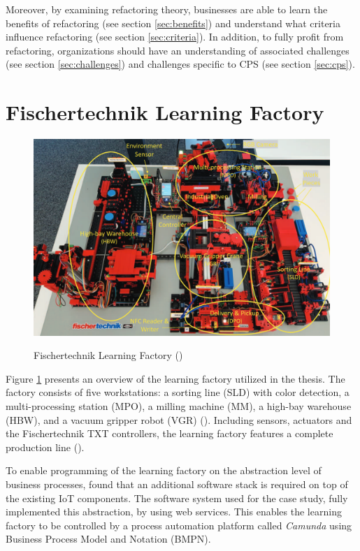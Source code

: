 Moreover, by examining refactoring theory, businesses are able to learn the benefits of refactoring (see section \ref{sec:benefits}) and understand what criteria influence refactoring (see section \ref{sec:criteria}). In addition, to fully profit from refactoring, organizations should have an understanding of associated challenges (see section \ref{sec:challenges}) and challenges specific to CPS (see section \ref{sec:cps}).

\section{Fischertechnik Learning Factory}
\label{sec:fischertechnik}

\begin{figure}[H]
    \centering
    \includegraphics[width=\textwidth]{./assets/factory}
    \label{fig:factory}
    \caption{Fischertechnik Learning Factory (\cite{seiger2020})}
\end{figure}

Figure \ref{fig:factory} presents an overview of the learning factory utilized in the thesis. The factory consists of five workstations: a sorting line (SLD) with color detection, a multi-processing station (MPO), a milling machine (MM), a high-bay warehouse (HBW), and a vacuum gripper robot (VGR) (\cite{seiger2020}). Including sensors, actuators and the Fischertechnik TXT controllers, the learning factory features a complete production line (\cite{malburg2020}).

To enable programming of the learning factory on the abstraction level of business processes, \textcite{malburg2020} found that an additional software stack is required on top of the existing IoT components. The software system used for the case study, fully implemented this abstraction, by using web services. This enables the learning factory to be controlled by a process automation platform called \emph{Camunda} using Business Process Model and Notation (BMPN). 

